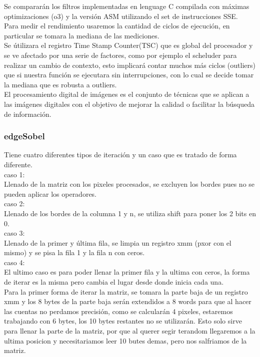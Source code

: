
Se compararán los filtros implementadas en lenguage C compilada con máximas optimizaciones (o3) y la versión ASM utilizando el set de instrucciones
SSE. \\
Para medir el rendimiento usaremos la cantidad de ciclos de ejecución, en particular se tomara la mediana de las mediciones.\\
Se útilizara el registro Time Stamp Counter(TSC) que es global del procesador y se ve afectado por una serie de factores,
como por ejemplo el scheluder para realizar un cambio de contexto, esto implicará contar muchos más ciclos (outliers)
 que si nuestra función se ejecutara sin interrupciones, con lo cual se decide tomar la mediana que es robusta a outliers.\\
El procesamiento digital de imágenes es el conjunto de técnicas que se aplican a las imágenes digitales con el objetivo de mejorar la calidad o facilitar la búsqueda de información. 


\subsubsection{edgeSobel}
Tiene cuatro diferentes tipos de iteraci\'on y un caso que es tratado de forma diferente.\\
caso 1:\\
	Llenado de la matriz con los pixeles procesados, se excluyen los bordes pues no se pueden aplicar los operadores.\\
caso 2:\\
	Llenado de los bordes de la columna 1 y n, se utiliza shift para poner los 2 bits en 0.\\
caso 3:\\
	Llenado de la primer y última fila, se limpia un registro xmm (pxor con el mismo) y se pisa la fila 1 y la fila n con ceros.\\
caso 4:\\
	El ultimo caso es para poder llenar la primer fila y la ultima con ceros, la forma de iterar es la misma pero cambia el lugar desde donde inicia cada una.\\

Para la primer forma de iterar la matriz, se tomara la parte baja de un registro xmm y los 8 bytes de la parte baja serán extendidos a 8 words para que al hacer las cuentas no perdamos precisión, como se calcularán 4 pixeles, estaremos trabajando con 6 bytes, los 10 bytes restantes no se utilizarán. Esto solo sirve para llenar la parte de la matriz, por que al querer segir terandom llegaremos a la ultima posicion y necesitariamos leer 10 butes demas, pero nos salfriamos de la matriz.\\

